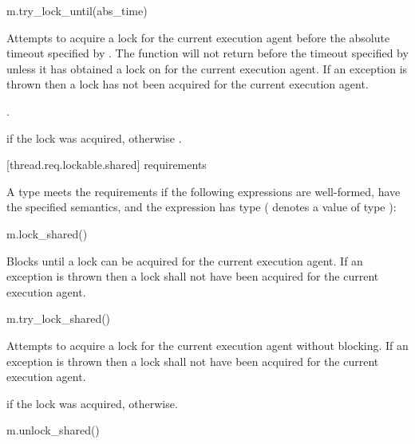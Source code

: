 \begin{itemdecl}
m.try_lock_until(abs_time)
\end{itemdecl}

\begin{itemdescr}
\pnum
\effects
Attempts to acquire a lock for the current execution agent before the absolute
timeout specified by . The function will not return
before the timeout specified by  unless it has obtained a lock on  for
the current execution agent. If an exception is thrown then a lock has not been acquired
for the current execution agent.

\pnum
\returntype {}.

\pnum
\returns
{} if the lock was acquired, otherwise .
\end{itemdescr}

[thread.req.lockable.shared]{ requirements}

\pnum
A type  meets the  requirements if
the following expressions are well-formed, have the specified semantics, and
the expression  has type 
( denotes a value of type ):

\begin{itemdecl}
m.lock_shared()
\end{itemdecl}

\begin{itemdescr}
\pnum
\effects
Blocks until a lock can be acquired for the current execution agent.
If an exception is thrown then a lock shall not have been acquired for
the current execution agent.
\end{itemdescr}

\begin{itemdecl}
m.try_lock_shared()
\end{itemdecl}

\begin{itemdescr}
\pnum
\effects
Attempts to acquire a lock for the current execution agent without blocking.
If an exception is thrown then a lock shall not have been acquired for
the current execution agent.

\pnum
\returns
{} if the lock was acquired,  otherwise.
\end{itemdescr}

\begin{itemdecl}
m.unlock_shared()
\end{itemdecl}

